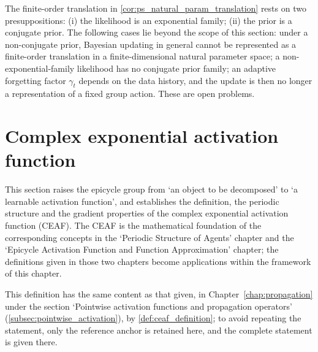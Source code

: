 \begin{remark}\label{rem:bayes-open-problems}
The finite-order translation in \cref{cor:ps_natural_param_translation} rests on two presuppositions: (i) the likelihood is an exponential family; (ii) the prior is a conjugate prior. The following cases lie beyond the scope of this section: under a non-conjugate prior, Bayesian updating in general cannot be represented as a finite-order translation in a finite-dimensional natural parameter space; a non-exponential-family likelihood has no conjugate prior family; an adaptive forgetting factor $\gamma_t$ depends on the data history, and the update is then no longer a representation of a fixed group action. These are open problems.
\end{remark}

\section{Complex exponential activation function}\label{sec:ps_ceaf}

\begin{remark}\label{rem:ceaf-positioning}
This section raises the epicycle group from `an object to be decomposed' to `a learnable activation function', and establishes the definition, the periodic structure and the gradient properties of the complex exponential activation function (CEAF). The CEAF is the mathematical foundation of the corresponding concepts in the `Periodic Structure of Agents' chapter and the `Epicycle Activation Function and Function Approximation' chapter; the definitions given in those two chapters become applications within the framework of this chapter.
\end{remark}

\begin{definition}\label{def:ceaf_definition_ps}
This definition has the same content as that given, in Chapter~\ref{chap:propagation} under the section `Pointwise activation functions and propagation operators' (\cref{subsec:pointwise_activation}), by \cref{def:ceaf_definition}; to avoid repeating the statement, only the reference anchor is retained here, and the complete statement is given there.
\end{definition}

